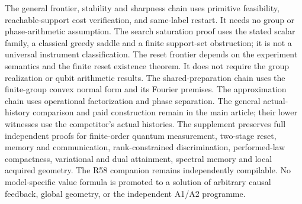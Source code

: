 The general frontier, stability and sharpness chain uses primitive feasibility,
reachable-support cost verification, and same-label restart.  It needs
no group or phase-arithmetic assumption.  The search saturation proof
uses the stated scalar family, a classical greedy saddle and a finite
support-set obstruction; it is not a universal instrument classification.
The reset frontier depends
on the experiment semantics and the finite
reset existence theorem.  It does not require the group realization or
qubit arithmetic results.  The shared-preparation chain uses the
finite-group convex normal form and its Fourier premises.  The
approximation chain uses operational factorization and phase separation.
The general actual-history comparison and paid construction remain in
the main article; their lower witnesses use the competitor's actual
histories.  The supplement preserves full independent proofs for
finite-order quantum measurement, two-stage reset, memory and
communication, rank-constrained discrimination, performed-law
compactness, variational and dual attainment, spectral memory and local
acquired geometry.  The R58 companion remains independently compilable.
No model-specific value formula is promoted to a solution of arbitrary
causal feedback, global geometry, or the independent A1/A2 programme.
